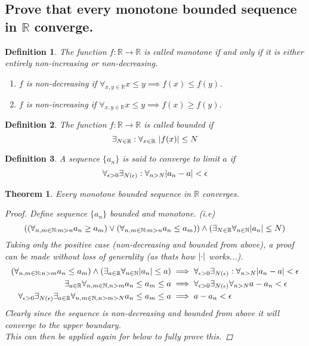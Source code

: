 \documentclass[]{article}
\newcommand{\R}{\mathbb{R}}
\newcommand{\N}{\mathbb{N}}
\newtheorem{definition}{Definition}
\newtheorem{theorem}{Theorem}
\begin{document}
\subsection{Prove that every monotone bounded sequence in $\R$ converge.}
\begin{definition}
    The function $f : \R \to \R$ is called \emph{monotone} if and only if it is either entirely non-increasing or non-decreasing.
    \begin{enumerate}
        \item $f$ is \emph{non-decreasing} if $\forall_{x,y \in \R} x \leq y \implies f(x) \leq f(y)$.
        \item $f$ is \emph{non-increasing} if $\forall_{x,y \in \R} x \leq y \implies f(x) \geq f(y)$.
    \end{enumerate}
\end{definition}
\begin{definition}
    The function $f : \R \to \R$ is called \emph{bounded} if 
    \[\exists_{N\in \R} : \forall_{x\in\R} \ \abs{f(x)} \leq N\]
\end{definition}
\begin{definition}
    A sequence $\{a_n\}$ is said to \emph{converge} to limit $a$ if 
    \[
        \forall_{\epsilon>0} \exists_{N(\epsilon)} : \forall_{n>N} \abs{a_n - a} < \epsilon 
    \]
\end{definition}
\begin{theorem}
    Every monotone bounded sequence in $\R$ converges.
    \begin{proof}
        Define sequence $\{a_n\}$ bounded and monotone. (i.e)
        \[\qty(\qty(\forall_{n,m\in \N : m > n} a_n \geq a_m) 
            \lor \qty(\forall_{n,m\in \N : m > n} a_n \leq a_m))
            \land \qty(\exists_{N \in \R} \forall_{n\in\N} \abs{a_n} \leq N)
        \]
        Taking only the positive case (non-decreasing and bounded from above), a proof can be made without loss of generality (as thats how $\abs{\cdot}$ works...).
        \begin{align*}
            \qty(\forall_{n,m\in \N : n>m} a_n \leq a_m) 
                \land \qty(\exists_{a \in \R} \forall_{n\in\N} \abs{a_n} \leq a)
                &\implies \forall_{\epsilon>0} \exists_{N(\epsilon)} : \forall_{n>N} \abs{a_n - a} < \epsilon\\
            \exists_{a \in \R} \forall_{n,m \in \N, n > m} a_n \leq a_m \leq a  
                &\implies \forall_{\epsilon>0} \exists_{N(\epsilon)} \forall_{n>N} a - a_n < \epsilon\\
            \forall_{\epsilon>0} \exists_{N(\epsilon)} \exists_{a \in \R} \forall_{n,m \in \N, n > m > N} a_n \leq a_m \leq a  
                &\implies  a - a_n < \epsilon
        \end{align*}
        Clearly since the sequence is non-decreasing and bounded from above it will converge to the upper boundary.\\
        This can then be applied again for below to fully prove this.
    \end{proof}
\end{theorem}
\end{document}
